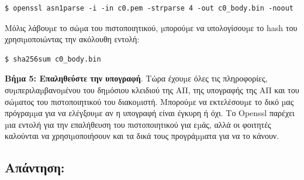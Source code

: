 \begin{lstlisting}
$ openssl asn1parse -i -in c0.pem -strparse 4 -out c0_body.bin -noout
\end{lstlisting}
\noindent
Μόλις λάβουµε το σώµα του πιστοποιητικού, µπορούµε να υπολογίσουµε το hash του
χρησιµοποιώντας την ακόλουθη εντολή:

\begin{lstlisting}
$ sha256sum c0_body.bin
\end{lstlisting}
\noindent
\textbf{Βήµα 5: Επαληθεύστε την υπογραφή}. Τώρα έχουµε όλες τις πληροφορίες,
συµπεριλαµβανοµένου του δηµόσιου κλειδιού της ΑΠ, της υπογραφής της ΑΠ και του σώµατος
του πιστοποιητικού του διακοµιστή. Μπορούµε να εκτελέσουµε το δικό µας πρόγραµµα για να
ελέγξουµε αν η υπογραφή είναι έγκυρη ή όχι. Το Openssl παρέχει µια εντολή για την
επαλήθευση του πιστοποιητικού για εµάς, αλλά οι φοιτητές καλούνται να χρησιµοποιήσουν και
τα δικά τους προγράµµατα για να το κάνουν.

\subsection*{Απάντηση:}

